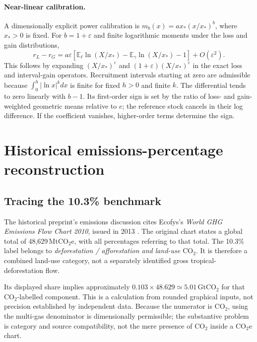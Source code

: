 \documentclass[11pt,a4paper]{article}
\newcommand{\COtwo}{\ensuremath{\mathrm{CO}_2}}
\newcommand{\COtwoe}{\ensuremath{\mathrm{CO}_2\mathrm{e}}}
\newcommand{\E}{\mathbb{E}}
\theoremstyle{remark}
\begin{document}
\paragraph{Near-linear calibration.}
A dimensionally explicit power calibration is $m_b(x)=a x_*(x/x_*)^b$, where $x_*>0$ is fixed. For $b=1+\varepsilon$ and finite logarithmic moments under the loss and gain distributions,
\begin{equation}
 r_L-r_G=a\varepsilon\!\left[\E_\ell\ln(X/x_*)-\E_\gamma\ln(X/x_*)-1\right]+O(\varepsilon^2).
 \label{eq:nearlinear}
\end{equation}
This follows by expanding $(X/x_*)^\varepsilon$ and $(1+\varepsilon)(X/x_*)^\varepsilon$ in the exact loss and interval-gain operators. Recruitment intervals starting at zero are admissible because $\int_0^h|\ln x|^k dx$ is finite for fixed $h>0$ and finite $k$. The differential tends to zero linearly with $b-1$. Its first-order sign is set by the ratio of loss- and gain-weighted geometric means relative to $e$; the reference stock cancels in their log difference. If the coefficient vanishes, higher-order terms determine the sign.


\section{Historical emissions-percentage reconstruction}\label{app:historical}
\subsection{Tracing the 10.3\% benchmark}
The historical preprint's emissions discussion cites Ecofys's \emph{World GHG Emissions Flow Chart 2010}, issued in 2013 \citep{Arellano2016,Ecofys2013}. The original chart states a global total of 48,629\,Mt\COtwoe{}, with all percentages referring to that total. The 10.3\% label belongs to \emph{deforestation / afforestation and land-use \COtwo{}}. It is therefore a combined land-use category, not a separately identified gross tropical-deforestation flow.

Its displayed share implies approximately $0.103\times48.629\simeq5.01$\,Gt\COtwo{} for that \COtwo{}-labelled component. This is a calculation from rounded graphical inputs, not precision established by independent data. Because the numerator is \COtwo{}, using the multi-gas denominator is dimensionally permissible; the substantive problem is category and source compatibility, not the mere presence of \COtwo{} inside a \COtwoe{} chart.
\end{document}
